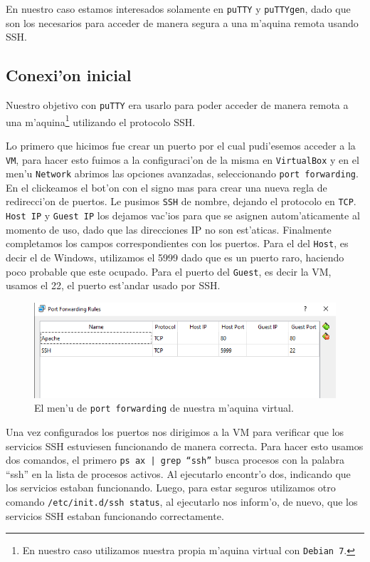 \documentclass[11pt]{article}
\begin{document}
		En nuestro caso estamos interesados solamente en \texttt{puTTY} y \texttt{puTTYgen}, dado que son los necesarios para acceder de manera segura a una m'aquina remota usando SSH.
		
	
	\subsection{Conexi'on inicial}
		Nuestro objetivo con \texttt{puTTY} era usarlo para poder acceder de manera remota a una m'aquina\footnote{En nuestro caso utilizamos nuestra propia m'aquina virtual con \texttt{Debian 7}.} utilizando el protocolo SSH.
				
		Lo primero que hicimos fue crear un puerto por el cual pudi'esemos acceder a la \texttt{VM}, para hacer esto fuimos a la configuraci'on de la misma en \texttt{VirtualBox} y en el men'u \texttt{Network} abrimos las opciones avanzadas, seleccionando \texttt{port forwarding}. En el clickeamos el bot'on con el signo mas para crear una nueva regla de redirecci'on de puertos. Le pusimos \texttt{SSH} de nombre, dejando el protocolo en \texttt{TCP}. \texttt{Host IP} y \texttt{Guest IP} los dejamos vac'ios para que se asignen autom'aticamente al momento de uso, dado que las direcciones IP no son est'aticas. Finalmente completamos los campos correspondientes con los puertos. Para el del \texttt{Host}, es decir el de Windows, utilizamos el 5999 dado que es un puerto raro, haciendo poco probable que este ocupado. Para el puerto del \texttt{Guest}, es decir la VM, usamos el 22, el puerto est'andar usado por SSH.
		
		\begin{figure}[H]
    			\centering
    			\includegraphics[scale=0.65]{Images/Install/port_forwarding.PNG}
    			\caption{El men'u de \texttt{port forwarding} de nuestra m'aquina virtual.}
    			\label{fig:port_forwarding}
		\end{figure}
		
		Una vez configurados los puertos nos dirigimos a la VM para verificar que los servicios SSH estuviesen funcionando de manera correcta. Para hacer esto usamos dos comandos, el primero \texttt{ps ax | grep ``ssh''} busca procesos con la palabra ``ssh'' en la lista de procesos activos. Al ejecutarlo encontr'o dos, indicando que los servicios estaban funcionando. Luego, para estar seguros utilizamos otro comando \texttt{/etc/init.d/ssh status}, al ejecutarlo nos inform'o, de nuevo, que los servicios SSH estaban funcionando correctamente. 
		
\end{document}
